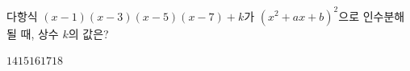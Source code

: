 다항식 $(x-1)(x-3)(x-5)(x-7)+k$가 $(x^2+ax+b)^2$으로 인수분해 될 때, 상수 $k$의 값은? 
\begin{choices32}{$14$}{$15$}{$16$}{$17$}{$18$}\end{choices32}
